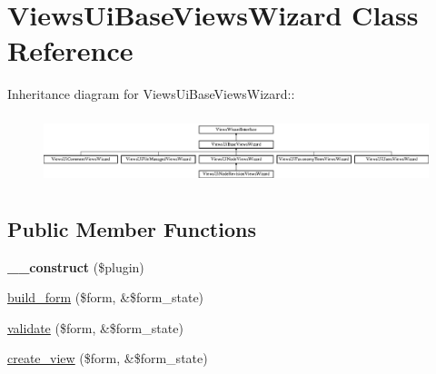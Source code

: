 \hypertarget{classViewsUiBaseViewsWizard}{
\section{ViewsUiBaseViewsWizard Class Reference}
\label{classViewsUiBaseViewsWizard}
}
Inheritance diagram for ViewsUiBaseViewsWizard::\begin{figure}[H]
\begin{center}
\leavevmode
\includegraphics[height=2.00897cm]{classViewsUiBaseViewsWizard}
\end{center}
\end{figure}
\subsection*{Public Member Functions}
\begin{DoxyCompactItemize}
\item 
\hypertarget{classViewsUiBaseViewsWizard_a6509cd6483f084cc7cd20a6a3b7724e5}{
{\bfseries \_\-\_\-construct} (\$plugin)}
\label{classViewsUiBaseViewsWizard_a6509cd6483f084cc7cd20a6a3b7724e5}

\item 
\hyperlink{classViewsUiBaseViewsWizard_aca015cf9fee6dd3ee556b18405f4dfe4}{build\_\-form} (\$form, \&\$form\_\-state)
\item 
\hyperlink{classViewsUiBaseViewsWizard_a894ab06673721a26809f0a662241641b}{validate} (\$form, \&\$form\_\-state)
\item 
\hyperlink{classViewsUiBaseViewsWizard_aef86de986b8438fc1b301d8413e69f00}{create\_\-view} (\$form, \&\$form\_\-state)
\end{DoxyCompactItemize}

